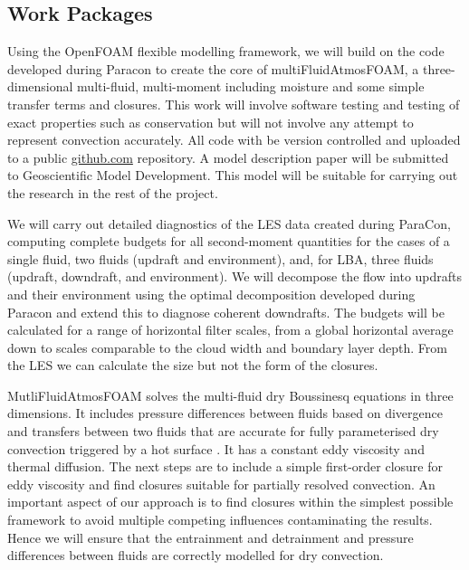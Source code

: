 \documentclass[11pt,a4paper]{article}
\begin{document}
\subsection{Work Packages}
\label{sec:WPs}


Using the OpenFOAM flexible modelling framework, we will build on the code developed during Paracon to create the core of multiFluidAtmosFOAM, a three-dimensional multi-fluid, multi-moment including moisture and some simple transfer terms and closures. This work will involve software testing and testing of exact properties such as conservation but will not involve any attempt to represent convection accurately. All code with be version controlled and uploaded to a public \url{github.com} repository. A model description paper will be submitted to Geoscientific Model Development. This model will be suitable for carrying out the research in the rest of the project. 


We will carry out detailed diagnostics of the LES data created during ParaCon, computing complete budgets for all second-moment quantities for the cases of a single fluid, two fluids (updraft and environment), and, for LBA, three fluids (updraft, downdraft, and environment).
We will decompose the flow into updrafts and their environment using the optimal decomposition developed during Paracon and extend this to diagnose coherent downdrafts. The budgets will be calculated for a range of horizontal filter scales, from a global horizontal average down to scales comparable to the cloud width and boundary layer depth. From the LES we can calculate the size but not the form of the closures.


MutliFluidAtmosFOAM solves the multi-fluid dry Boussinesq equations in three dimensions. It includes pressure differences between fluids based on divergence and transfers between two fluids that are accurate for fully parameterised dry convection triggered by a hot surface \cite[]{WMS20}. It has a constant eddy viscosity and thermal diffusion. The next steps are to include a simple first-order closure for eddy viscosity and find closures suitable for partially resolved convection. An important aspect of our approach is to find closures within the simplest possible framework to avoid multiple competing influences contaminating the results. Hence we will ensure that the entrainment and detrainment and pressure differences between fluids are correctly modelled for dry convection. 
\end{document}
